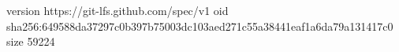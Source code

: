 version https://git-lfs.github.com/spec/v1
oid sha256:649588da37297c0b397b75003dc103aed271c55a38441eaf1a6da79a131417c0
size 59224
